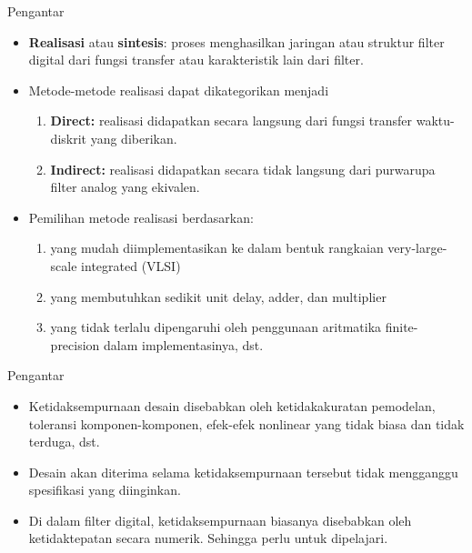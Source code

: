 \documentclass[pdflatex,compress,mathserif]{beamer}
\begin{document}
\begin{frame}{Pengantar}
	\begin{itemize}
		\item \textbf{Realisasi} atau \textbf{sintesis}: proses menghasilkan jaringan atau struktur filter digital dari fungsi transfer atau karakteristik lain dari filter.
		\item Metode-metode realisasi dapat dikategorikan menjadi
		\begin{enumerate}
			\item \textbf{Direct:} realisasi didapatkan secara langsung dari fungsi transfer waktu-diskrit yang diberikan.
			\item \textbf{Indirect:} realisasi didapatkan secara tidak langsung dari purwarupa filter analog yang ekivalen.
		\end{enumerate}
		\item Pemilihan metode realisasi berdasarkan:
		\begin{enumerate}
			\item yang mudah diimplementasikan ke dalam bentuk rangkaian very-large-scale integrated (VLSI)
			\item yang membutuhkan sedikit unit delay, adder, dan multiplier
			\item yang tidak terlalu dipengaruhi oleh penggunaan aritmatika finite-precision dalam implementasinya, dst.
		\end{enumerate}
	\end{itemize}
\end{frame}

\begin{frame}{Pengantar}
	\begin{itemize}
		\item Ketidaksempurnaan desain disebabkan oleh ketidakakuratan pemodelan, toleransi komponen-komponen, efek-efek nonlinear yang tidak biasa dan tidak terduga, dst.
		\item Desain akan diterima selama ketidaksempurnaan tersebut tidak mengganggu spesifikasi yang diinginkan.
		\item Di dalam filter digital, ketidaksempurnaan biasanya disebabkan oleh ketidaktepatan secara numerik. Sehingga perlu untuk dipelajari.
	\end{itemize}
\end{frame}
\end{document}
